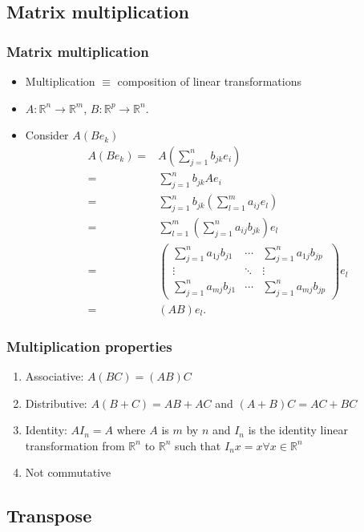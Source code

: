 \documentclass[compress]{beamer}
\def\R{\mathbb{R}}
\theoremstyle{definition}
\begin{document}
\subsection{Matrix multiplication}

\begin{frame}[shrink]
  \frametitle{Matrix multiplication}
  \begin{itemize}
  \item Multiplication $ \equiv$ composition of linear transformations
  \item $A: \R^n \rightarrow \R^m$, $B:\R^p \rightarrow \R^n$.
  \item Consider $A(B e_k)$
    \begin{align*}
      A(B e_k) = & A (\sum_{j=1}^n b_{jk} e_i) \\
      = & \sum_{j=1}^n b_{jk} A e_i \\
      = & \sum_{j=1}^n b_{jk} \left(\sum_{l=1}^m a_{ij} e_l\right)  \\
      = & \sum_{l=1}^m \left(\sum_{j=1}^n a_{ij} b_{jk} \right) e_l \\
      = & \begin{pmatrix} 
        \sum_{j=1}^n a_{1j} b_{j1} & \cdots & \sum_{j=1}^n a_{1j} b_{jp} \\
        \vdots & \ddots & \vdots \\
        \sum_{j=1}^n a_{mj} b_{j1} & \cdots & \sum_{j=1}^n a_{mj} b_{jp}
      \end{pmatrix} e_l \\
      = & (AB) e_l.
    \end{align*}
  \end{itemize}
\end{frame}

\begin{frame}
  \frametitle{Multiplication properties}
  \begin{enumerate}
  \item Associative: $A(BC) = (AB) C$
  \item Distributive: $A(B+C) = AB + AC$ and $(A+B)C = AC + BC$
  \item Identity: $AI_n = A$ where $A$ is $m$ by $n$ and $I_n$ is the
    identity linear transformation from $\R^n$ to $\R^n$ such that $I_nx = x
    \forall x \in \R^n$
  \item Not commutative
  \end{enumerate}
\end{frame}

\subsection{Transpose}
\end{document}
